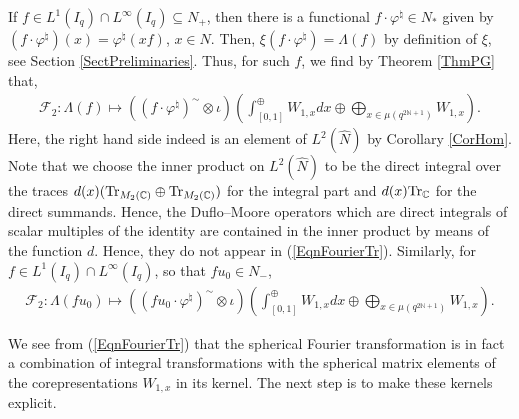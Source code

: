 \documentclass[pdftex]{sigma}
\numberwithin{equation}{section}
\theoremstyle{definition}
\begin{document}
If $f \in L^1(I_q) \cap L^\infty(I_q) \subseteq N_+$, then there is a   functional $f\cdot \varphi^\natural \in N_\ast$ given by  $(f\cdot \varphi^\natural )(x) = \varphi^\natural(x f)$, $x \in N$. Then, $\xi(f\cdot \varphi^\natural ) = \Lambda(f)$ by def\/inition of $\xi$, see Section \ref{SectPreliminaries}. Thus, for such $f$, we f\/ind by Theorem \ref{ThmPG} that,
\begin{gather}\label{EqnFourierTr}
\mathcal{F}_2: \Lambda(f) \mapsto    ((f \cdot \varphi^\natural)^\sim  \otimes \iota) \left( \int^\oplus_{[0,1]} W_{1,x}  dx  \oplus \bigoplus_{x \in \mu(q^{2\mathbb{N}+1})}      W_{1,x}  \right).
\end{gather}
Here, the right hand side indeed is an element of $L^2(\hat{N})$ by Corollary \ref{CorHom}. Note that we choose the inner product on $L^2(\hat{N})$ to be the direct integral over the traces  $d(x) ( {\rm Tr}_{M_2(\mathbb{C})} \oplus  {\rm Tr}_{M_2(\mathbb{C})}   ) $ for the integral part and $d(x) {\rm Tr}_{\mathbb{C}}$ for the direct summands. Hence, the Duf\/lo--Moore operators which are direct integrals of scalar multiples of the identity are contained in the inner product by means of the function $d$. Hence, they do not appear in (\ref{EqnFourierTr}).
Similarly, for $f \in L^1(I_q) \cap L^\infty(I_q)$, so that $f u_0 \in N_-$,
\begin{gather}\label{EqnFourierTrII}
\mathcal{F}_2: \Lambda(f u_0) \mapsto    ((f u_0 \cdot \varphi^\natural)^\sim  \otimes \iota) \left( \int^\oplus_{[0,1]} W_{1,x}  dx  \oplus \bigoplus_{x \in \mu(q^{2\mathbb{N}+1})}      W_{1,x}  \right).
\end{gather}

We see from (\ref{EqnFourierTr}) that the spherical Fourier transformation   is in fact a combination of integral transformations with the spherical matrix elements of the corepresentations $W_{1,x}$ in its kernel. The next step is to make these kernels explicit.
\end{document}
